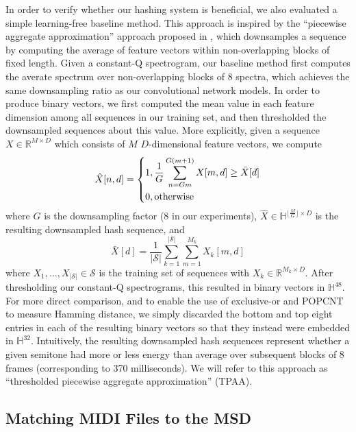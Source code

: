 In order to verify whether our hashing system is beneficial, we also evaluated a simple learning-free baseline method.
This approach is inspired by the ``piecewise aggregate approximation'' approach proposed in \cite{keogh2001dimensionality,yi2000fast}, which downsamples a sequence by computing the average of feature vectors within non-overlapping blocks of fixed length.
Given a constant-Q spectrogram, our baseline method first computes the averate spectrum over non-overlapping blocks of 8 spectra, which achieves the same downsampling ratio as our convolutional network models.
In order to produce binary vectors, we first computed the mean value in each feature dimension among all sequences in our training set, and then thresholded the downsampled sequences about this value.
More explicitly, given a sequence $X \in \mathbb{R}^{M \times D}$ which consists of $M$ $D$-dimensional feature vectors, we compute
\begin{equation}
\hat{X}[n, d] = \begin{dcases}
1, \frac{1}{G} \sum_{n = Gm}^{G(m + 1)} X[m, d] \ge \bar{X}[d]\\
0, \mathrm{otherwise}
\end{dcases}
\end{equation}
where $G$ is the downsampling factor ($8$ in our experiments), $\hat{X} \in \mathbb{H}^{\lfloor \frac{M}{G} \rfloor \times D}$ is the resulting downsampled hash sequence, and
\begin{equation}
\bar{X}[d] = \frac{1}{|\mathcal{S}|} \sum_{k = 1}^{|\mathcal{S}|} \sum_{m = 1}^{M_k} X_k[m, d]
\end{equation}
where $X_1, \ldots, X_{|\mathcal{S}|} \in \mathcal{S}$ is the training set of sequences with $X_k \in \mathbb{R}^{M_k \times D}$.
After thresholding our constant-Q spectrograms, this resulted in binary vectors in $\mathbb{H}^{48}$.
For more direct comparison, and to enable the use of exclusive-or and POPCNT to measure Hamming distance, we simply discarded the bottom and top eight entries in each of the resulting binary vectors so that they instead were embedded in $\mathbb{H}^{32}$.
Intuitively, the resulting downsampled hash sequences represent whether a given semitone had more or less energy than average over subsequent blocks of 8 frames (corresponding to 370 milliseconds).
We will refer to this approach as ``thresholded piecewise aggregate approximation'' (TPAA).

\subsection{Matching MIDI Files to the MSD}

